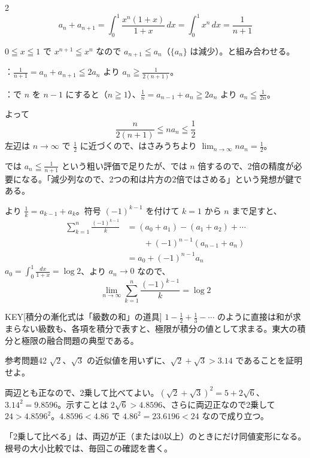 \documentclass[paper=b5j, fontsize=8pt, fleqn, twoside]{jlreq}
\begin{document}
\begin{multicols*}{2}
  \[a_n+a_{n+1}=\int_0^1\frac{x^n(1+x)}{1+x}\,dx=\int_0^1x^n\,dx=\frac1{n+1}\]
  \QED

  $0\leqq x\leqq1$ で $x^{n+1}\leqq x^n$ なので $a_{n+1}\leqq a_n$（$\{a_n\}$ は減少）。と組み合わせる。\par
  ：$\frac1{n+1}=a_n+a_{n+1}\leqq2a_n$ より $a_n\geqq\frac1{2(n+1)}$。\par
  ：で $n$ を $n-1$ にすると（$n\geqq1$）、$\frac1n=a_{n-1}+a_n\geqq2a_n$ より $a_n\leqq\frac1{2n}$。\par
  よって
  \[\frac n{2(n+1)}\leqq na_n\leqq\frac12\]
  左辺は $n\to\infty$ で $\frac12$ に近づくので、はさみうちより $\displaystyle\lim_{n\to\infty}na_n=\frac12$。\QED

  \begin{memo}
    では $a_n\leqq\frac1{n+1}$ という粗い評価で足りたが、では $n$ 倍するので、2倍の精度が必要になる。「減少列なので、2つの和は片方の2倍ではさめる」という発想が鍵である。
  \end{memo}

  より $\frac1k=a_{k-1}+a_k$。符号 $(-1)^{k-1}$ を付けて $k=1$ から $n$ まで足すと、
  \[
  \begin{aligned}
  \sum_{k=1}^n\frac{(-1)^{k-1}}k&=(a_0+a_1)-(a_1+a_2)+\cdots\\
  &\qquad+(-1)^{n-1}(a_{n-1}+a_n)\\
  &=a_0+(-1)^{n-1}a_n
  \end{aligned}
  \]
  $a_0=\int_0^1\frac{dx}{1+x}=\log2$、より $a_n\to0$ なので、
  \[\lim_{n\to\infty}\sum_{k=1}^n\frac{(-1)^{k-1}}k=\log2\]
  \QED

  \begin{ptbs}{KEY}[積分の漸化式は「級数の和」の道具]
    $1-\frac12+\frac13-\cdots$ のように直接は和が求まらない級数も、各項を積分で表すと、極限が積分の値として求まる。東大の積分と極限の融合問題の典型である。
  \end{ptbs}

  \begin{simple}[出典：オリジナル]{参考問題42}
    $\sqrt2$、$\sqrt3$ の近似値を用いずに、$\sqrt2+\sqrt3>3.14$ であることを証明せよ。
  \end{simple}
  \Kai
  両辺とも正なので、2乗して比べてよい。$(\sqrt2+\sqrt3)^2=5+2\sqrt6$、$3.14^2=9.8596$。示すことは $2\sqrt6>4.8596$、さらに両辺正なので2乗して $24>4.8596^2$。$4.8596<4.86$ で $4.86^2=23.6196<24$ なので成り立つ。\QED
  \begin{memo}
    「2乗して比べる」は、両辺が正（または0以上）のときにだけ同値変形になる。根号の大小比較では、毎回この確認を書く。
  \end{memo}


\end{multicols*}
\end{document}
